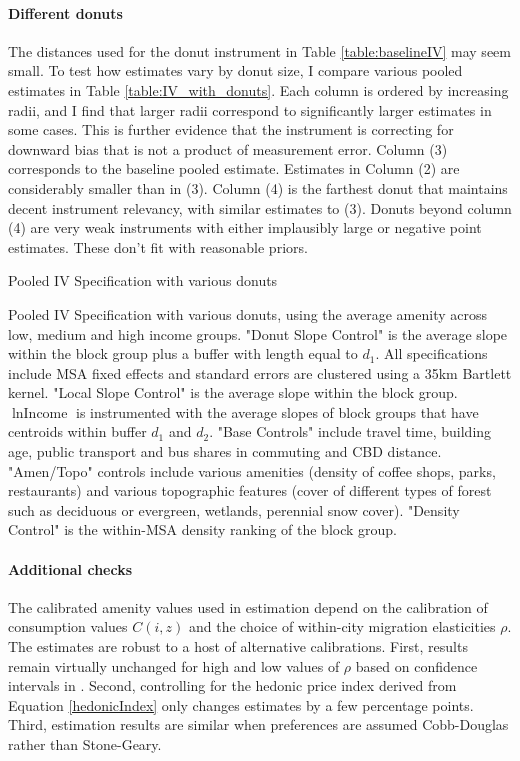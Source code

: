 \documentclass[12pt]{article}
\begin{document}
	\clearpage
		\paragraph{Different donuts} The distances used for the donut instrument in Table \ref{table:baselineIV} may seem small. To test how estimates vary by donut size, I compare various pooled estimates in Table \ref{table:IV_with_donuts}. Each column is ordered by increasing radii, and I find that larger radii correspond to significantly larger estimates in some cases. This is further evidence that the instrument is correcting for downward bias that is not a product of measurement error. Column (3) corresponds to the baseline pooled estimate. Estimates in Column (2) are considerably smaller than in (3). Column (4) is the farthest donut that maintains decent instrument relevancy, with similar estimates to (3). Donuts beyond column (4) are very weak instruments with either implausibly large or negative point estimates. These don't fit with reasonable priors.
	
	\begin{table}
		\caption{Pooled IV Specification with various donuts}\label{table:IV_with_donuts}
		\makebox[\textwidth]{}
		\caption*{Pooled IV Specification with various donuts, using the average amenity across low, medium and high income groups. "Donut Slope Control" is the average slope within the block group plus a buffer with length equal to $d_{1}$. All specifications include MSA fixed effects and standard errors are clustered using a 35km Bartlett kernel. "Local Slope Control" is the average slope within the block group. $\ln \text{Income}$ is instrumented with the average slopes of block groups that have centroids within buffer $d_{1}$ and $d_{2}$. "Base Controls" include travel time, building age, public transport and bus shares in commuting and CBD distance. "Amen/Topo" controls include various amenities (density of coffee shops, parks, restaurants) and various topographic features (cover of different types of forest such as deciduous or evergreen, wetlands, perennial snow cover). "Density Control" is the within-MSA density ranking of the block group.}
	\end{table}
	
		\paragraph*{Additional checks} The calibrated amenity values used in estimation depend on the calibration of consumption values $C(i, z)$ and the choice of within-city migration elasticities $\rho$. The estimates are robust to a host of alternative calibrations. First, results remain virtually unchanged for high and low values of $\rho$ based on confidence intervals in \cite{BSH}. Second, controlling for the hedonic price index derived from Equation \eqref{hedonicIndex} only changes estimates by a few percentage points. Third, estimation results are similar when preferences are assumed Cobb-Douglas rather than Stone-Geary. 
	
\end{document}

